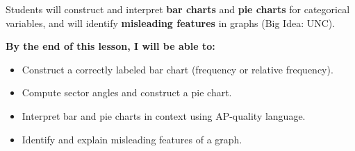 \documentclass[aspectratio=169, 11pt]{beamer}
\begin{document}
{
\begin{frame}[t, plain]
  \vspace{0.45cm}\par
  \hspace{0.55cm}%
  \begin{minipage}{0.9\textwidth}


    \normalsize
    Students will construct and interpret \textbf{bar charts} and
    \textbf{pie charts} for categorical variables, and will identify
    \textbf{misleading features} in graphs (Big Idea: UNC).

    \vspace{0.45cm}

    \normalsize\textbf{\color{navy}By the end of this lesson, I will be able to:}

    \smallskip
    \begin{itemize}
      \setlength{\itemsep}{0.3em}\setlength{\topsep}{0.2em}
      \item Construct a correctly labeled bar chart (frequency or relative frequency).
      \item Compute sector angles and construct a pie chart.
      \item Interpret bar and pie charts in context using AP-quality language.
      \item Identify and explain misleading features of a graph.
    \end{itemize}

  \end{minipage}
\end{frame}
}
\end{document}
